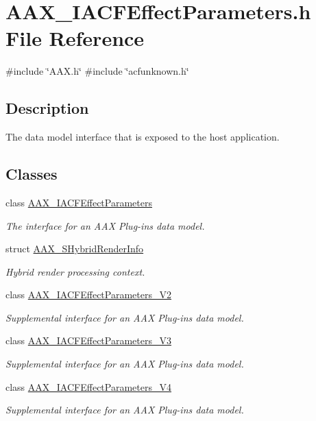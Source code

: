\hypertarget{a00530}{}\section{A\+A\+X\+\_\+\+I\+A\+C\+F\+Effect\+Parameters.\+h File Reference}
\label{a00530}
{\ttfamily \#include \char`\"{}A\+A\+X.\+h\char`\"{}}\newline
{\ttfamily \#include \char`\"{}acfunknown.\+h\char`\"{}}\newline


\subsection{Description}
The data model interface that is exposed to the host application. 

\subsection*{Classes}
\begin{DoxyCompactItemize}
\item 
class \mbox{\hyperlink{a01669}{A\+A\+X\+\_\+\+I\+A\+C\+F\+Effect\+Parameters}}
\begin{DoxyCompactList}\small\item\em The interface for an A\+AX Plug-\/in\textquotesingle{}s data model. \end{DoxyCompactList}\item 
struct \mbox{\hyperlink{a01673}{A\+A\+X\+\_\+\+S\+Hybrid\+Render\+Info}}
\begin{DoxyCompactList}\small\item\em Hybrid render processing context. \end{DoxyCompactList}\item 
class \mbox{\hyperlink{a01677}{A\+A\+X\+\_\+\+I\+A\+C\+F\+Effect\+Parameters\+\_\+\+V2}}
\begin{DoxyCompactList}\small\item\em Supplemental interface for an A\+AX Plug-\/in\textquotesingle{}s data model. \end{DoxyCompactList}\item 
class \mbox{\hyperlink{a01681}{A\+A\+X\+\_\+\+I\+A\+C\+F\+Effect\+Parameters\+\_\+\+V3}}
\begin{DoxyCompactList}\small\item\em Supplemental interface for an A\+AX Plug-\/in\textquotesingle{}s data model. \end{DoxyCompactList}\item 
class \mbox{\hyperlink{a01685}{A\+A\+X\+\_\+\+I\+A\+C\+F\+Effect\+Parameters\+\_\+\+V4}}
\begin{DoxyCompactList}\small\item\em Supplemental interface for an A\+AX Plug-\/in\textquotesingle{}s data model. \end{DoxyCompactList}\end{DoxyCompactItemize}
